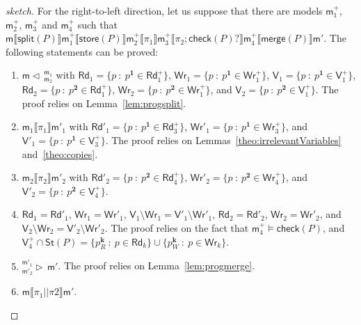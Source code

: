 \documentclass{llncs}
\newcommand{\progStore}{\mathsf{store}}
\newcommand{\progOkChange}{\mathsf{check}}
\newcommand{\progsplit}{\mathsf{split}}
\newcommand{\progmerge}{\mathsf{merge}}
\newcommand{\cp}[2]{{#2}^\mathbf{#1}}
\newcommand{\cpr}[2]{\cp{#1}{#2}_R}
\newcommand{\cpw}[2]{\cp{#1}{#2}_W}
\newcommand{\modl}{\mathsf m}
\newcommand{\mrg}[3]{ ^{#2}_{#3} \triangleright \, #1 }
\newcommand{\pll}{ {||} }							%
\newcommand{\splt}[3]{ #1 \triangleleft \, ^{#2}_{#3} }
\newcommand{\readset}{\mathsf{Rd}}
\newcommand{\valuset}{\mathsf{V}}
\newcommand{\writeset}{\mathsf{Wr}}
\newcommand{\storeset}{\mathsf{St}}
\newcommand{\intPgm}[1]{\llbracket #1 \rrbracket}
\newcommand{\set}[1]{\{#1\}}
\newcommand{\suchthat}{~ : ~}
\begin{document}
\begin{proof}[sketch]
For the right-to-left direction, let us suppose that there are
models $\modl^+_1$, $\modl^+_2$, $\modl^+_3$ and $\modl^+_4$ such that
$\modl \intPgm{\progsplit(P)} \modl^+_1 \intPgm{\progStore(P)} \modl^+_2 \intPgm{\pi_1} \modl^+_3
\intPgm{\pi_2 ; \progOkChange(P)?} \modl^+_4 \intPgm{\progmerge(P)} \modl'$.
The following statements can be proved:
\begin{enumerate}
  \item\label{pllequivalence:rtl:split}
        $\splt{\modl}{\modl_1}{\modl_2}$ with
        $\readset_1 = \set{ p \suchthat \cp 1 p \in \readset^+_1}$,
        $\writeset_1 = \set{ p \suchthat \cp 1 p \in \writeset^+_1}$,
        $\valuset_1 = \set{ p \suchthat \cp 1 p \in \valuset^+_1}$,
        $\readset_2 = \set{ p \suchthat \cp 2 p \in \readset^+_1}$,
        $\writeset_2 = \set{ p \suchthat \cp 2 p \in \writeset^+_1}$, and
        $\valuset_2 = \set{ p \suchthat \cp 2 p \in \valuset^+_1}$.
        The proof relies on Lemma~\ref{lem:progsplit}.
  \item\label{pllequivalence:rtl:pi1}
        $\modl_1 \intPgm{\pi_1} \modl'_1$ with
        $\readset'_1 = \set{ p \suchthat \cp 1 p \in \readset^+_3}$,
        $\writeset'_1 = \set{ p \suchthat \cp 1 p \in \writeset^+_3}$, and
        $\valuset'_1 = \set{ p \suchthat \cp 1 p \in \valuset^+_3}$.
        The proof relies on Lemmas~\ref{theo:irrelevantVariables} and~\ref{theo:copies}.
  \item\label{pllequivalence:rtl:pi2}
        $\modl_2 \intPgm{\pi_2} \modl'_2$ with
        $\readset'_2 = \set{ p \suchthat \cp 2 p \in \readset^+_4}$,
        $\writeset'_2 = \set{ p \suchthat \cp 2 p \in \writeset^+_4}$, and
        $\valuset'_2 = \set{ p \suchthat \cp 2 p \in \valuset^+_4}$.
  \item\label{pllequivalence:rtl:check}
        $\readset_1 = \readset'_1 $, $\writeset_1 = \writeset'_1 $,
        $\valuset_1 \setminus \writeset_1 = \valuset'_1 \setminus \writeset'_1$,
        $\readset_2 = \readset'_2 $, $\writeset_2 = \writeset'_2 $, and
        $\valuset_2 \setminus \writeset_2 = \valuset'_2 \setminus \writeset'_2$.
        The proof relies on the fact that $\modl^+_4 \models \progOkChange(P)$, and
        $\valuset^+_4 \cap \storeset(P) =
        \set{ \cpr k p \suchthat p \in \readset_k} \cup
        \set{ \cpw k p \suchthat p \in \writeset_k}$.
  \item\label{pllequivalence:rtl:merge}
        $\mrg{\modl'}{\modl'_1}{\modl'_2}$.
        The proof relies on Lemma~\ref{lem:progmerge}.
  \item $\modl \intPgm{\pi_1 \pll \pi2} \modl'$.
\end{enumerate}
\end{proof}
\end{document}
